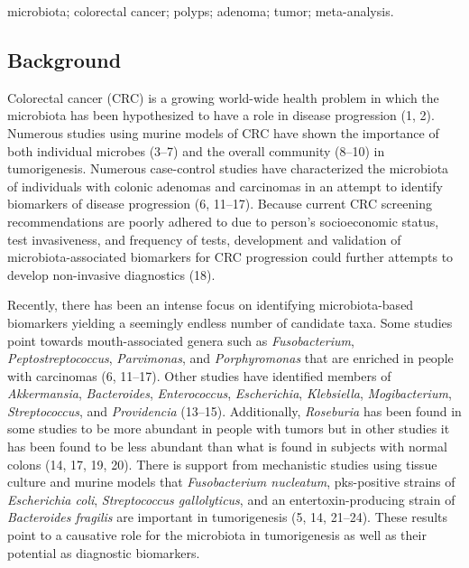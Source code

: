 \documentclass[12pt,]{article}
\begin{document}
microbiota; colorectal cancer; polyps; adenoma; tumor; meta-analysis.

\newpage

\subsection{Background}\label{background}

Colorectal cancer (CRC) is a growing world-wide health problem in which
the microbiota has been hypothesized to have a role in disease
progression (1, 2). Numerous studies using murine models of CRC have
shown the importance of both individual microbes (3--7) and the overall
community (8--10) in tumorigenesis. Numerous case-control studies have
characterized the microbiota of individuals with colonic adenomas and
carcinomas in an attempt to identify biomarkers of disease progression
(6, 11--17). Because current CRC screening recommendations are poorly
adhered to due to person's socioeconomic status, test invasiveness, and
frequency of tests, development and validation of microbiota-associated
biomarkers for CRC progression could further attempts to develop
non-invasive diagnostics (18).

Recently, there has been an intense focus on identifying
microbiota-based biomarkers yielding a seemingly endless number of
candidate taxa. Some studies point towards mouth-associated genera such
as \emph{Fusobacterium}, \emph{Peptostreptococcus}, \emph{Parvimonas},
and \emph{Porphyromonas} that are enriched in people with carcinomas (6,
11--17). Other studies have identified members of \emph{Akkermansia},
\emph{Bacteroides}, \emph{Enterococcus}, \emph{Escherichia},
\emph{Klebsiella}, \emph{Mogibacterium}, \emph{Streptococcus}, and
\emph{Providencia} (13--15). Additionally, \emph{Roseburia} has been
found in some studies to be more abundant in people with tumors but in
other studies it has been found to be less abundant than what is found
in subjects with normal colons (14, 17, 19, 20). There is support from
mechanistic studies using tissue culture and murine models that
\emph{Fusobacterium nucleatum}, pks-positive strains of
\emph{Escherichia coli}, \emph{Streptococcus gallolyticus}, and an
entertoxin-producing strain of \emph{Bacteroides fragilis} are important
in tumorigenesis (5, 14, 21--24). These results point to a causative
role for the microbiota in tumorigenesis as well as their potential as
diagnostic biomarkers.
\end{document}
